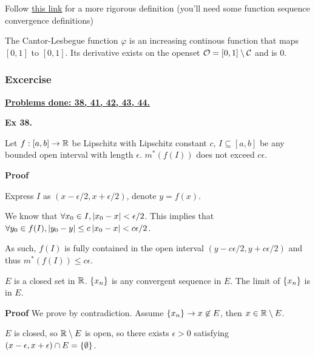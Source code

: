 \begin{defn}
    Follow \href{https://www.math.purdue.edu/~torresm/lecture-notes/lebesgue-theory/lebesgue-lecture16.pdf}{this link} 
    for a more rigorous definition (you'll need some function sequence convergence definitions)
\end{defn}

\begin{prop}
    The Cantor-Lesbegue function $\varphi$ is an increasing continous function that maps $[0,1]$ to $[0,1]$.
    Its derivative exists on the openset $\mathcal{O} = [0,1]\setminus \mathcal{C}$ and is 0.
\end{prop}

\subsubsection{Excercise}
\underline{\textbf{Problems done: 38, 41, 42, 43, 44.}}
\bigskip



\noindent {} \textbf{Ex 38.} \label{ex:2_38}
\begin{lem}
    Let $f: [a,b]\to \mathbb{R}$ be Lipschitz with Lipschitz constant $c$, $I \subseteq [a,b]$ be any bounded open interval with length $\epsilon$.
    $m^\ast(f(I))$ does not exceed $c\epsilon$.
\end{lem}
\textbf{Proof}

Express $I$ as $(x-\epsilon/2, x+\epsilon/2)$, denote $y = f(x)$.

We know that $\forall x_0 \in I, \left|x_0 - x\right| < \epsilon/2$.
This implies that $\forall y_0 \in f(I), \left|y_0 - y\right| \leq c\left|x_0 - x\right| < c\epsilon/2$.

As such, $f(I)$ is fully contained in the open interval $(y-c\epsilon/2, y+c\epsilon/2)$ and thus $m^\ast(f(I)) \leq c\epsilon$.


\begin{lem}
    $E$ is a closed set in $\mathbb{R}$. $\left\{x_n\right\}$ is any convergent sequence in $E$.
    The limit of $\left\{x_n\right\}$ is in $E$.
\end{lem}
\textbf{Proof} We prove by contradiction. Assume $\left\{x_n\right\} \to x \not\in E$, then $x \in \mathbb{R}\setminus E$. 

$E$ is closed, so $\mathbb{R}\setminus E$ is open, so there exists $\epsilon > 0$ satisfying $(x-\epsilon, x+\epsilon) \cap E = \left\{\emptyset\right\}$.

